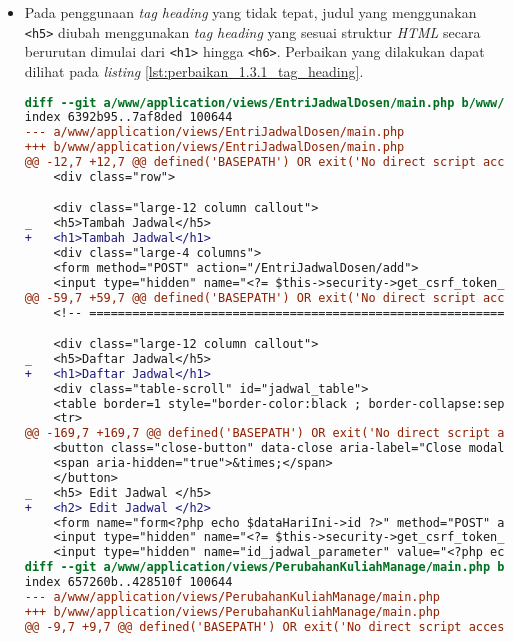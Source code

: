 \begin{itemize}
\item Pada penggunaan \textit{tag heading} yang tidak tepat, judul yang menggunakan \texttt{<h5>} diubah menggunakan \textit{tag heading} yang sesuai struktur \textit{HTML} secara berurutan dimulai dari \texttt{<h1>} hingga \texttt{<h6>}. Perbaikan yang dilakukan dapat dilihat pada \textit{listing} \ref{lst:perbaikan_1.3.1_tag_heading}.
\begin{lstlisting}[frame=single, label={lst:perbaikan_1.3.1_tag_heading}, language=diff, caption=Perbaikan Kriteria Sukses 1.3.1 pada Bagian \textit{Heading}]
diff --git a/www/application/views/EntriJadwalDosen/main.php b/www/application/views/EntriJadwalDosen/main.php
index 6392b95..7af8ded 100644
--- a/www/application/views/EntriJadwalDosen/main.php
+++ b/www/application/views/EntriJadwalDosen/main.php
@@ -12,7 +12,7 @@ defined('BASEPATH') OR exit('No direct script access allowed');
    <div class="row">

    <div class="large-12 column callout">
_   <h5>Tambah Jadwal</h5>
+   <h1>Tambah Jadwal</h1>
    <div class="large-4 columns">
    <form method="POST" action="/EntriJadwalDosen/add">
    <input type="hidden" name="<?= $this->security->get_csrf_token_name() ?>" value="<?= $this->security->get_csrf_hash() ?>" />
@@ -59,7 +59,7 @@ defined('BASEPATH') OR exit('No direct script access allowed');
    <!-- ===================================================================== Pembentukan Tabel ============================================================================= -->

    <div class="large-12 column callout">
_   <h5>Daftar Jadwal</h5>
+   <h1>Daftar Jadwal</h1>
    <div class="table-scroll" id="jadwal_table">
    <table border=1 style="border-color:black ; border-collapse:separate">
    <tr> 
@@ -169,7 +169,7 @@ defined('BASEPATH') OR exit('No direct script access allowed');
    <button class="close-button" data-close aria-label="Close modal" type="button">
    <span aria-hidden="true">&times;</span>
    </button>
_   <h5> Edit Jadwal </h5>
+   <h2> Edit Jadwal </h2>
    <form name="form<?php echo $dataHariIni->id ?>" method="POST" action="/EntriJadwalDosen/update/<?php echo $dataHariIni->id ?>">
    <input type="hidden" name="<?= $this->security->get_csrf_token_name() ?>" value="<?= $this->security->get_csrf_hash() ?>" />
    <input type="hidden" name="id_jadwal_parameter" value="<?php echo $dataHariIni->id ?>"> </a> <br>
diff --git a/www/application/views/PerubahanKuliahManage/main.php b/www/application/views/PerubahanKuliahManage/main.php
index 657260b..428510f 100644
--- a/www/application/views/PerubahanKuliahManage/main.php
+++ b/www/application/views/PerubahanKuliahManage/main.php
@@ -9,7 +9,7 @@ defined('BASEPATH') OR exit('No direct script access allowed');


\end{lstlisting}
\end{itemize}
